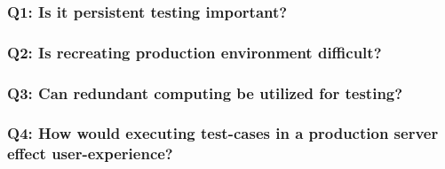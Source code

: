 \subsubsection{\textbf{Q1:} Is it persistent testing important?}
\subsubsection{\textbf{Q2:} Is recreating production environment difficult?}
\subsubsection{\textbf{Q3:} Can redundant computing be utilized for testing?}
\subsubsection{\textbf{Q4:} How would executing test-cases in a production server effect user-experience?}
\fi